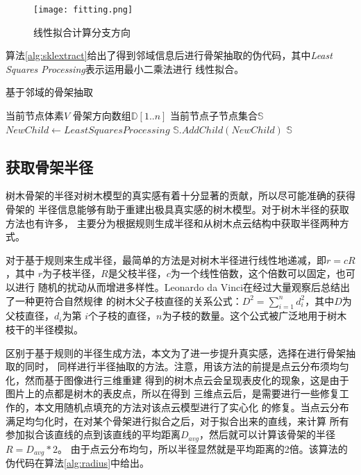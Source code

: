 \begin{figure}[H]
	\centering
	\texttt{[image: fitting.png]}
	\caption{线性拟合计算分支方向}
	\label{fig:fitting}
\end{figure}

算法\ref{alg:sklextract}给出了得到邻域信息后进行骨架抽取的伪代码，其中\textit{Least Squares Processing}表示运用最小二乘法进行
线性拟合。

\begin{algorithm}[H]
	\caption{基于邻域的骨架抽取}
	\label{alg:sklextract}
	\begin{algorithmic}[1] 
		\Require 当前节点体素$V$
		\Require 骨架方向数组$\mathbb{D}[1..n]$
		\Ensure 当前节点子节点集合$\mathbb{S}$
			\State $NewChild\gets Least Squares Processing$
			\State $\mathbb{S}.AddChild(NewChild)$
		\EndFor
		\State \Return $\mathbb{S}$
	\end{algorithmic}
\end{algorithm}

\subsection{获取骨架半径}
树木骨架的半径对树木模型的真实感有着十分显著的贡献，所以尽可能准确的获得骨架的
半径信息能够有助于重建出极具真实感的树木模型。对于树木半径的获取方法也有许多，
主要分为根据规则生成半径和从树木点云结构中获取半径两种方式。

对于基于规则来生成半径，最简单的方法是对树木半径进行线性地递减，即$r=cR$，其中
$r$为子枝半径，$R$是父枝半径，$c$为一个线性倍数，这个倍数可以固定，也可以进行
随机的扰动从而增进多样性。Leonardo da Vinci在经过大量观察后总结出了一种更符合自然规律
的树木父子枝直径的关系公式：$D^2=\sum_{i=1}^n{d_i^2}$，其中$D$为父枝直径，$d_i$为第
$i$个子枝的直径，$n$为子枝的数量。这个公式被广泛地用于树木枝干的半径模拟。

区别于基于规则的半径生成方法，本文为了进一步提升真实感，选择在进行骨架抽取的同时，
同样进行半径抽取的方法。注意，用该方法的前提是点云分布须均匀化，然而基于图像进行三维重建
得到的树木点云会呈现表皮化的现象，这是由于图片上的点都是树木的表皮点，所以在得到
三维点云后，是需要进行一些修复工作的，本文用随机点填充的方法对该点云模型进行了实心化
的修复。当点云分布满足均匀化时，在对某个骨架进行拟合之后，对于拟合出来的直线，来计算
所有参加拟合该直线的点到该直线的平均距离$D_{avg}$，然后就可以计算该骨架的半径$R=D_{avg}*2$。
由于点云分布均匀，所以半径显然就是平均距离的2倍。该算法的伪代码在算法\ref{alg:radius}中给出。\\

